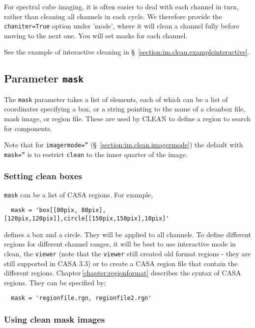 For spectral cube imaging, it is often easier to deal with each
channel in turn, rather than cleaning all channels in each cycle.  We
therefore provide the {\tt chaniter=True} option under 'mode', where
it will clean a channel fully before moving to the next one.  You will
set masks for each channel. 

See the example of interactive cleaning in 
\S~\ref{section:im.clean.exampleinteractive}.

\subsection{Parameter {\tt mask} }
\label{section:im.clean.mask}

The {\tt mask} parameter takes a list of elements, each of which can
be a list of coordinates specifying a box,
or a string pointing to the name of a cleanbox file, mask image, or
region file.  These are used by CLEAN to define a region to search for components.  

Note that for {\tt imagermode=''} (\S~\ref{section:im.clean.imagermode}) 
the default with {\tt mask=''} is to restrict {\tt clean} to the inner
quarter of the image.

\subsubsection{Setting clean boxes }
\label{section:im.clean.mask.box}

{\tt mask} can be a list of CASA regions.  For example,
\small
\begin{verbatim}
  mask = 'box[[80pix, 80pix],[120pix,120pix]],circle[[150pix,150pix],10pix]'
\end{verbatim}
\normalsize defines a box and a circle. They will be applied to all
channels. To define different regions for different channel ranges, it
will be best to use interactive mode in clean, the {\tt viewer} (note
that the {\tt viewer} still created old format regions - they are
still supported in CASA 3.3) or to create a CASA region file that
contain the different regions. Chapter\,\ref{chapter:regionformat}
describes the syntax of CASA regions. They can be specified by;

\small
\begin{verbatim}
  mask = 'regionfile.rgn, regionfile2.rgn'
\end{verbatim}
\normalsize

\subsubsection{Using clean mask images}
\label{section:im.clean.mask.maskimage}

